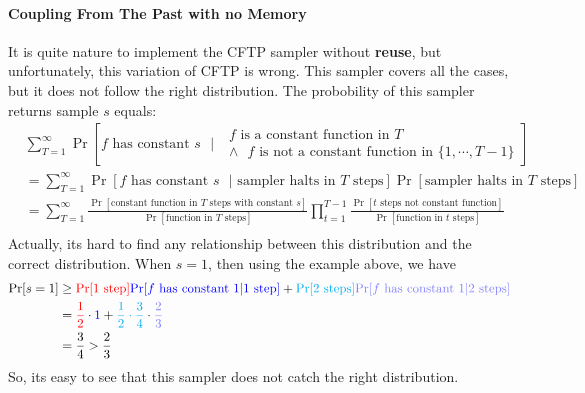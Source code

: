 \paragraph{Coupling From The Past with no Memory}
It is quite nature to implement the CFTP sampler without \textbf{reuse}, but unfortunately, this variation of CFTP is wrong.
This sampler covers all the cases, but it does not follow the right distribution.
The probobility of this sampler returns sample $s$ equals:
\begin{align*}
&\sum_{T=1}^\infty \Pr[\mbox{$f$ has constant $s$ $|$ $\substack{\mbox{$f$ is a constant function in $T$}\\ \mbox{$\land$ $f$ is not a constant function in $\{1, \cdots, T-1\}$}}$}] \\
                  &= \sum_{T=1}^\infty \Pr[\mbox{$f$ has constant $s$ $|$ sampler halts in $T$ steps}] \Pr[\mbox{sampler halts in $T$ steps}] \\
  &= \sum_{T=1}^\infty \frac{\Pr[\mbox{constant function in $T$ steps with constant $s$}]}{\Pr[\mbox{function in $T$ steps}]} \prod_{t=1}^{T-1}\frac{\Pr[\mbox{$t$ steps not constant function}]}{\Pr[\mbox{function in $t$ steps}]} \\
\end{align*}
Actually, its hard to find any relationship between this distribution and the correct distribution.
When $s = 1$, then using the example above, we have
\begin{align*}
  \Pr[s = 1] &\geq \textcolor{red}{\Pr[\mbox{1 step}]}\textcolor{blue}{\Pr[\mbox{$f$ has constant $1$} | \mbox{1 step}]} + \textcolor{cyan}{\Pr[\mbox{2 steps}]}\textcolor{blue!50}{\Pr[\mbox{$f$ has constant $1$} | \mbox{2 steps}]} \\
             &= \textcolor{red}{\frac{1}{2}}\cdot \textcolor{blue}{1} + \textcolor{cyan}{\frac{1}{2}\cdot\frac{3}{4}}\cdot\textcolor{blue!50}{\frac{2}{3}} \\
  &= \frac{3}{4} > \frac{2}{3}
\end{align*}
So, its easy to see that this sampler does not catch the right distribution.

\begin{center}
 \hspace{0.5cm}
\end{center}

